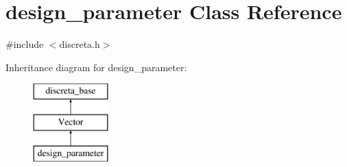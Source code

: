 \hypertarget{classdesign__parameter}{}\section{design\+\_\+parameter Class Reference}
\label{classdesign__parameter}


{\ttfamily \#include $<$discreta.\+h$>$}

Inheritance diagram for design\+\_\+parameter\+:\begin{figure}[H]
\begin{center}
\leavevmode
\includegraphics[height=3.000000cm]{classdesign__parameter}
\end{center}
\end{figure}
